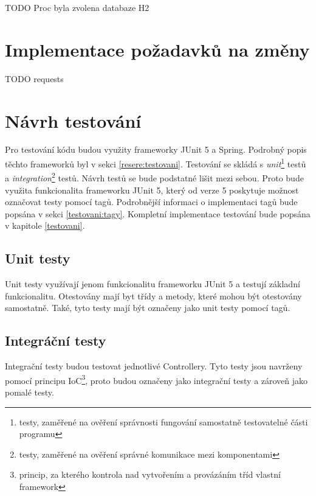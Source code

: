     TODO Proc byla zvolena databaze H2
    
\section{Implementace požadavků na změny}\label{impl:requests}
    TODO requests
    
\section{Návrh testování}\label{navrh:testovani}
    Pro testování kódu budou využity frameworky JUnit 5 a Spring. Podrobný popis těchto frameworků byl v sekci \ref{resere:testovani}. Testování se skládá s \textit{unit}\footnote{testy, zaměřené na ověření správnosti fungování samostatně testovatelné části programu} testů a \textit{integration}\footnote{testy, zaměřené na ověření správné komunikace mezi komponentami} testů. Návrh testů se bude podstatné lišit mezi sebou. Proto bude využita funkcionalita frameworku JUnit 5, který od verze 5 poskytuje možnost označovat testy pomocí tagů\cite{junit-tags}. Podrobnější informaci o implementaci tagů bude popsána v sekci \ref{testovani:tagy}. Kompletní implementace testování bude popsána v kapitole \ref{testovani}.
    
    \subsection{Unit testy}
        Unit testy využívají jenom funkcionalitu frameworku JUnit 5 a testují základní funkcionalitu. Otestovány mají byt třídy a metody, které mohou být otestovány samostatně. Také, tyto testy mají být označeny jako unit testy pomocí tagů.  %
        
    \subsection{Integráční testy}
        Integrační testy budou testovat jednotlivé Controllery. Tyto testy jsou navrženy pomocí principu IoC\footnote{princip, za kterého kontrola nad vytvořením a provázáním tříd vlastní framework}, proto budou označeny jako integrační testy a zároveň jako pomalé testy.